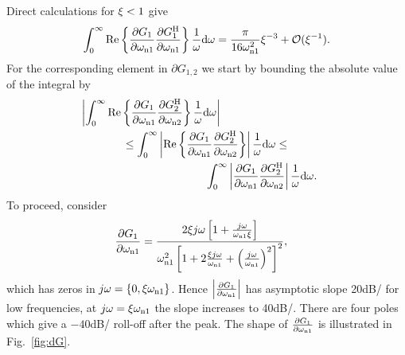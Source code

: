 Direct calculations for $\damping < 1$ give
\begin{align}
\label{eq:auto}
\int_0^\infty\mathrm{Re}\left\{\frac{\partial G_1}{\partial \wn[1]}\frac{\partial G_1^{\HT}}{\partial \wn[1]}\right\}\frac{1}{\omega}\dd\omega = \frac{\pi}{16\wn[1]^2}\damping^{-3} + \mathcal{O}(\damping^{-1}).
\end{align}
For the corresponding element in $\partial G_{1,2}$ we start by bounding the absolute value of the integral by
\begin{gather}
\left|\int_0^\infty\mathrm{Re}\left\{\frac{\partial G_1}{\partial \wn[1]}\frac{\partial G_2^{\HT}}{\partial \wn[2]}\right\}\frac{1}{\omega}\dd\omega\right|
\qquad \qquad \qquad \qquad \qquad
\label{eq:cross1} \\
\leq
\int_0^\infty\left|\mathrm{Re}\left\{\frac{\partial G_1}{\partial \wn[1]}\frac{\partial G_2^{\HT}}{\partial \wn[2]}\right\}\right|\frac{1}{\omega}\dd\omega
\leq \\
\qquad \qquad \qquad \qquad \qquad
\int_0^\infty\left|\frac{\partial G_1}{\partial \wn[1]}\frac{\partial G_2^{\HT}}{\partial \wn[2]}\right|\frac{1}{\omega}\dd\omega \text{.}\label{eq:cross}
\end{gather}
To proceed, consider
\begin{align}
\frac{\partial G_1}{\partial \wn[1]} &= \frac{2\damping j\omega\left[1+\frac{j\omega}{\wn[1]\damping}\right]}{\wn[1]^2\left[1+2\frac{\damping j\omega}{\wn[1]} + \left(\frac{j\omega}{\wn[1]}\right)^2\right]^2},
\end{align}
which has zeros in $j\omega=\left\{0, \damping\wn[1]\right\}$. 
Hence $\left|\frac{\partial G_1}{\partial \wn[1]} \right|$ has asymptotic slope 20\unit{dB/\decade} for low frequencies, at $j\omega=\damping\wn[1]$ the slope increases to 40\unit{dB/\decade}. There are four poles which give a $-40$\unit{dB/\decade} roll-off after the peak. 
The shape of $\frac{\partial G_1}{\partial \wn[1]} $ is illustrated in Fig.~\ref{fig:dG}.

